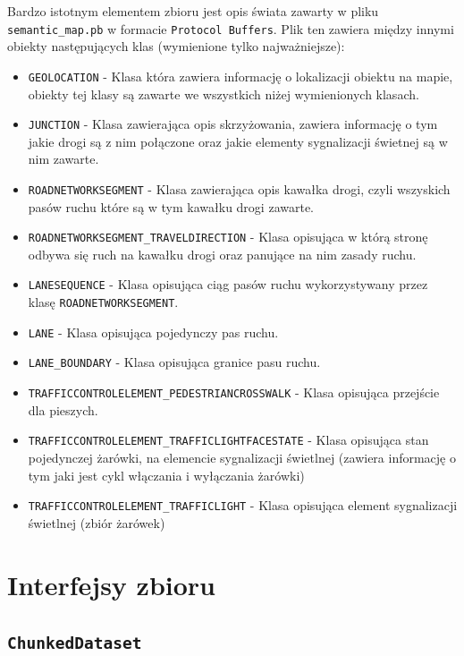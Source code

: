 \noindent
Bardzo istotnym elementem zbioru jest opis świata zawarty w pliku \texttt{semantic\_map.pb} w formacie \texttt{Protocol Buffers}. Plik ten zawiera między innymi obiekty następujących klas (wymienione tylko najważniejsze):
    \begin{itemize}
    \setlength{\itemsep}{1pt}
    \setlength{\parskip}{0.2em}
    \setlength{\parsep}{0.2em}
    \item \texttt{GEOLOCATION} - Klasa która zawiera informację o lokalizacji obiektu na mapie, obiekty tej klasy są zawarte we wszystkich niżej wymienionych klasach.
    \item \texttt{JUNCTION} - Klasa zawierająca opis skrzyżowania, zawiera informację o tym jakie drogi są z nim połączone oraz jakie elementy sygnalizacji świetnej są w nim zawarte.
    \item \texttt{ROADNETWORKSEGMENT} - Klasa zawierająca opis kawałka drogi, czyli wszyskich pasów ruchu które są w tym kawałku drogi zawarte.
    \item \texttt{ROADNETWORKSEGMENT\_TRAVELDIRECTION} - Klasa opisująca w którą stronę odbywa się ruch na kawałku drogi oraz panujące na nim zasady ruchu.
    \item \texttt{LANESEQUENCE} - Klasa opisująca ciąg pasów ruchu wykorzystywany przez klasę \texttt{ROADNETWORKSEGMENT}.
    \item \texttt{LANE} - Klasa opisująca pojedynczy pas ruchu.
    \item \texttt{LANE\_BOUNDARY} - Klasa opisująca granice pasu ruchu.
    \item \texttt{TRAFFICCONTROLELEMENT\_PEDESTRIANCROSSWALK} - Klasa opisująca przejście dla pieszych.
    \item \texttt{TRAFFICCONTROLELEMENT\_TRAFFICLIGHTFACESTATE} - Klasa opisująca stan pojedynczej żarówki, na elemencie sygnalizacji świetlnej (zawiera informację o tym jaki jest cykl włączania i wyłączania żarówki)
    \item \texttt{TRAFFICCONTROLELEMENT\_TRAFFICLIGHT} - Klasa opisująca element sygnalizacji świetlnej (zbiór żarówek)
\end{itemize}

\section{Interfejsy zbioru}
\subsection{\texttt{ChunkedDataset}}


